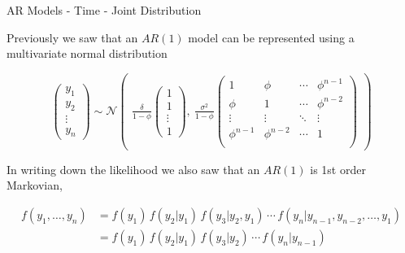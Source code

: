 \documentclass[11pt,ignorenonframetext,]{beamer}
\begin{document}
\begin{frame}[t]{AR Models - Time - Joint Distribution}
\protect\hypertarget{ar-models---time---joint-distribution}{}

Previously we saw that an \(AR(1)\) model can be represented using a
multivariate normal distribution

\[
\begin{pmatrix}
y_1 \\ y_2 \\ \vdots \\ y_n
\end{pmatrix}
\sim \mathcal{N} \begin{pmatrix}
\frac{\delta}{1-\phi} \begin{pmatrix}1\\ 1\\ \vdots\\ 1\end{pmatrix},~
\frac{\sigma^2}{1-\phi}
\begin{pmatrix}
1      & \phi   & \cdots & \phi^{n-1} \\
\phi   & 1      & \cdots & \phi^{n-2} \\
\vdots & \vdots & \ddots & \vdots     \\
\phi^{n-1} & \phi^{n-2}  & \cdots & 1 \\
\end{pmatrix}
\end{pmatrix}
\]

\pause

\vspace{2mm}

In writing down the likelihood we also saw that an \(AR(1)\) is 1st
order Markovian,

\[ \begin{aligned}
f(y_1, \ldots, y_n) 
  &= f(y_1) \, f(y_2 | y_1) \,  f(y_3|y_2,y_1) \,\cdots\, f(y_n|y_{n-1},y_{n-2},\ldots,y_1) \\
  &= f(y_1) \, f(y_2 | y_1) \,  f(y_3|y_2) \,\cdots\, f(y_n|y_{n-1})
\end{aligned} \]

\end{frame}
\end{document}
